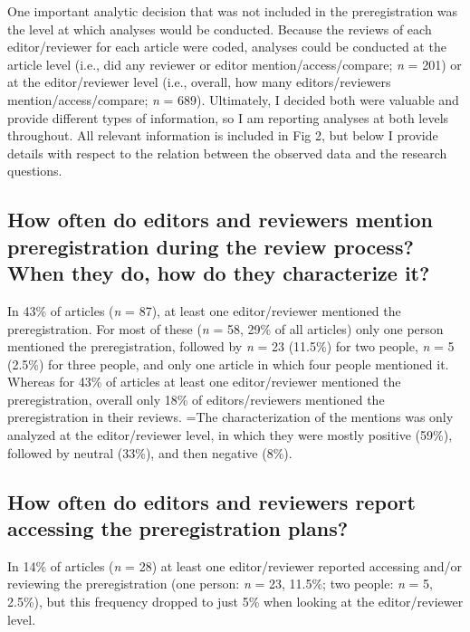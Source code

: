 \documentclass[authordate, empirical]{jote-new-article}
\begin{document}
	One important analytic decision that was not included in the preregistration was the level at which analyses would be conducted. Because the reviews of each editor/reviewer for each article were coded, analyses could be conducted at the article level (i.e., did any reviewer or editor mention/access/compare; \emph{n} = 201) or at the editor/reviewer level (i.e., overall, how many editors/reviewers mention/access/compare; \emph{n} = 689). Ultimately, I decided both were valuable and provide different types of information, so I am reporting analyses at both levels throughout. All relevant information is included in Fig 2, but below I provide details with respect to the relation between the observed data and the research questions.



	\subsection{\textbf{How often do editors and reviewers mention preregistration during the review process? When they do, how do they characterize it?}}



	In 43\% of articles (\emph{n} = 87), at least one editor/reviewer mentioned the preregistration. For most of these (\emph{n} = 58, 29\% of all articles) only one person mentioned the preregistration, followed by \emph{n} = 23 (11.5\%) for two people, \emph{n} = 5 (2.5\%) for three people, and only one article in which four people mentioned it. Whereas for 43\% of articles at least one editor/reviewer mentioned the preregistration, overall only 18\% of editors/reviewers mentioned the preregistration in their reviews. =The characterization of the mentions was only analyzed at the editor/reviewer level, in which they were mostly positive (59\%), followed by neutral (33\%), and then negative (8\%).

	

	\subsection{\textbf{How often do editors and reviewers report accessing the preregistration plans?}}



	In 14\% of articles (\emph{n} = 28) at least one editor/reviewer reported accessing and/or reviewing the preregistration (one person: \emph{n} = 23, 11.5\%; two people: \emph{n} = 5, 2.5\%), but this frequency dropped to just 5\% when looking at the editor/reviewer level.
\end{document}
